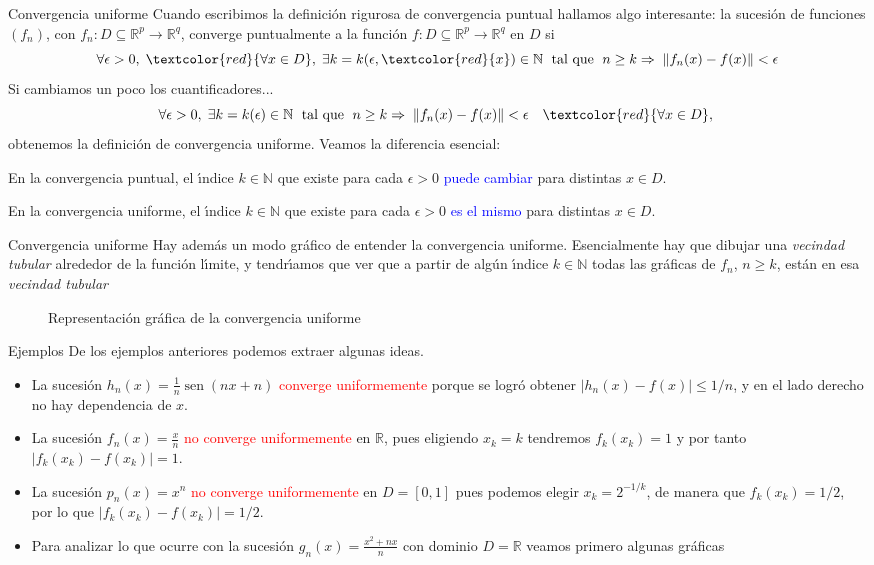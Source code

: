 \documentclass[xcolor=dvipsnames,10pt,handout, draft]{beamer}
\DeclareMathOperator{\sen}{sen}
\newcommand{\incfig}[1]{%
    \def\svgwidth{3.5in}
    {#1.pdf_tex}
}
\newcommand{\nz}{\mathbb N}
\newcommand{\rz}{\mathbb R}
\newcommand{\rzp}{\mathbb R^{p}}
\newcommand{\rzq}{\mathbb R^{q}}
\begin{document}
\begin{frame}{Convergencia uniforme}
Cuando escribimos la definici\'on rigurosa de convergencia puntual hallamos algo interesante: la sucesi\'on de funciones $(f_n)$, con $f_n:D\subseteq\rzp\to\rzq$, converge puntualmente a la funci\'on $f:D\subseteq\rzp\to\rzq$ en $D$ si\pause
$$\forall\epsilon>0,\;\textcolor{red}{\forall x\in D},\; \exists k=k(\epsilon,\textcolor{red}{x})\in\nz\;\text{ tal que }\;n\geq k\Rightarrow\;\|f_n(x)-f(x)\|<\epsilon$$\pause
Si cambiamos un poco los cuantificadores...
$$\forall\epsilon>0,\;\exists k=k(\epsilon)\in\nz\;\text{ tal que }\;n\geq k\Rightarrow\;\|f_n(x)-f(x)\|<\epsilon\quad\textcolor{red}{\forall x\in D},\; $$\pause
obtenemos la definici\'on de convergencia uniforme.
\vskip4pt\pause
Veamos la diferencia esencial: \pause

En la convergencia puntual, el \'\i ndice $k\in\nz$ que existe para cada $\epsilon>0$ \textcolor{blue}{puede cambiar} para distintas $x\in D$.\pause

En la convergencia uniforme, el \'\i ndice $k\in\nz$ que existe para cada $\epsilon>0$ \textcolor{blue}{es el mismo} para distintas $x\in D$.
\end{frame}

\begin{frame}{Convergencia uniforme}
Hay adem\'as un modo gr\'afico de entender la convergencia uniforme. \pause\vskip4pt
Esencialmente hay que dibujar una {\em vecindad tubular} alrededor de la funci\'on l\'\i mite, y tendr\'\i amos que ver que a partir de alg\'un \'\i ndice $k\in\nz$ todas las gr\'aficas de $f_n$, $n\geq k$, est\'an en esa {\em vecindad tubular}\pause
\begin{figure}[ht]
    \centering
\caption{Representaci\'on gr\'afica de la convergencia uniforme}
\end{figure}
\end{frame}


\begin{frame}{Ejemplos}
De los ejemplos anteriores podemos extraer algunas ideas.\pause
\begin{itemize}
\item La sucesi\'on $\displaystyle h_n(x)=\frac{1}{n}\sen(nx+n)$ \textcolor{red}{converge uniformemente} porque se logr\'o obtener $|h_n(x)-f(x)|\leq 1/n$, y en el lado derecho no hay dependencia de $x$.\pause
\item La sucesi\'on $\displaystyle f_n(x)=\frac{x}{n}$ \textcolor{red}{no converge uniformemente} en $\rz$, \pause pues eligiendo $x_k=k$ tendremos $f_k(x_k)=1$ y por tanto $|f_k(x_k)-f(x_k)|=1$.\pause
\item La sucesi\'on $p_n(x)=x^n$ \textcolor{red}{no converge uniformemente} en $D=[0,1]$ pues podemos elegir $x_k=2^{-1/k}$, de manera que $f_k(x_k)=1/2$, por lo que $|f_k(x_k)-f(x_k)|=1/2$.\pause
\item Para analizar lo que ocurre con la sucesi\'on $\displaystyle g_n(x)=\frac{x^2+nx}{n}$ con dominio $D=\rz$ veamos primero algunas gr\'aficas
\end{itemize}
\end{frame}
\end{document}
